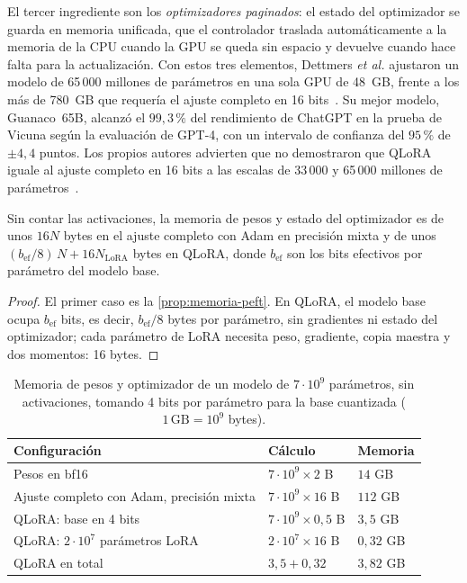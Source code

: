 El tercer ingrediente son los \emph{optimizadores paginados}: el estado del optimizador se guarda en memoria unificada, que el controlador traslada automáticamente a la memoria de la CPU cuando la GPU se queda sin espacio y devuelve cuando hace falta para la actualización. Con estos tres elementos, Dettmers \emph{et al.} ajustaron un modelo de 65\,000 millones de parámetros en una sola GPU de 48~GB, frente a los más de 780~GB que requería el ajuste completo en 16 bits~\cite[§1]{dettmers}. Su mejor modelo, Guanaco~65B, alcanzó el $99{,}3\,\%$ del rendimiento de ChatGPT en la prueba de Vicuna según la evaluación de GPT-4, con un intervalo de confianza del $95\,\%$ de $\pm 4{,}4$ puntos. Los propios autores advierten que no demostraron que QLoRA iguale al ajuste completo en 16 bits a las escalas de 33\,000 y 65\,000 millones de parámetros~\cite[§8]{dettmers}.

\begin{proposicion}\label{prop:mem-qlora}
Sin contar las activaciones, la memoria de pesos y estado del optimizador es de unos $16N$ bytes en el ajuste completo con Adam en precisión mixta y de unos $(b_{\mathrm{ef}}/8)\,N+16N_{\mathrm{LoRA}}$ bytes en QLoRA, donde $b_{\mathrm{ef}}$ son los bits efectivos por parámetro del modelo base.
\end{proposicion}

\begin{proof}
El primer caso es la \cref{prop:memoria-peft}. En QLoRA, el modelo base ocupa $b_{\mathrm{ef}}$ bits, es decir, $b_{\mathrm{ef}}/8$ bytes por parámetro, sin gradientes ni estado del optimizador; cada parámetro de LoRA necesita peso, gradiente, copia maestra y dos momentos: 16 bytes.
\end{proof}

\begin{table}[h]
\centering\small
\caption{Memoria de pesos y optimizador de un modelo de $7\cdot 10^{9}$ parámetros, sin activaciones, tomando 4 bits por parámetro para la base cuantizada ($1\,\mathrm{GB}=10^{9}$ bytes).}\label{tab:memoria}
\begin{tabular}{@{}lll@{}}
\toprule
Configuración & Cálculo & Memoria \\
\midrule
Pesos en bf16 & $7\cdot 10^{9}\times 2$ B & $14$ GB \\
Ajuste completo con Adam, precisión mixta & $7\cdot 10^{9}\times 16$ B & $112$ GB \\
QLoRA: base en 4 bits & $7\cdot 10^{9}\times 0{,}5$ B & $3{,}5$ GB \\
QLoRA: $2\cdot 10^{7}$ parámetros LoRA & $2\cdot 10^{7}\times 16$ B & $0{,}32$ GB \\
QLoRA en total & $3{,}5+0{,}32$ & $3{,}82$ GB \\
\bottomrule
\end{tabular}
\end{table}

